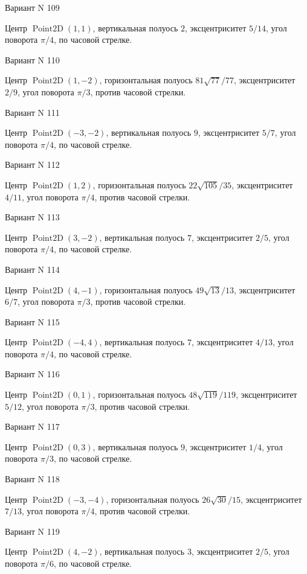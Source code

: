 \documentclass[11pt]{report}
\begin{document}
Вариант N 109

Центр $\operatorname{Point2D}\left(1, 1\right)$, вертикальная полуось $2$, эксцентриситет $5 / 14$, угол поворота $\pi / 4$, по часовой стрелке.

Вариант N 110

Центр $\operatorname{Point2D}\left(1, -2\right)$, горизонтальная полуось $81 \sqrt{77} / 77$, эксцентриситет $2 / 9$, угол поворота $\pi / 3$, против часовой стрелки.

Вариант N 111

Центр $\operatorname{Point2D}\left(-3, -2\right)$, вертикальная полуось $9$, эксцентриситет $5 / 7$, угол поворота $\pi / 4$, по часовой стрелке.

Вариант N 112

Центр $\operatorname{Point2D}\left(1, 2\right)$, горизонтальная полуось $22 \sqrt{105} / 35$, эксцентриситет $4 / 11$, угол поворота $\pi / 4$, против часовой стрелки.

Вариант N 113

Центр $\operatorname{Point2D}\left(3, -2\right)$, вертикальная полуось $7$, эксцентриситет $2 / 5$, угол поворота $\pi / 4$, по часовой стрелке.

Вариант N 114

Центр $\operatorname{Point2D}\left(4, -1\right)$, горизонтальная полуось $49 \sqrt{13} / 13$, эксцентриситет $6 / 7$, угол поворота $\pi / 3$, против часовой стрелки.

Вариант N 115

Центр $\operatorname{Point2D}\left(-4, 4\right)$, вертикальная полуось $7$, эксцентриситет $4 / 13$, угол поворота $\pi / 4$, по часовой стрелке.

Вариант N 116

Центр $\operatorname{Point2D}\left(0, 1\right)$, горизонтальная полуось $48 \sqrt{119} / 119$, эксцентриситет $5 / 12$, угол поворота $\pi / 3$, против часовой стрелки.

Вариант N 117

Центр $\operatorname{Point2D}\left(0, 3\right)$, вертикальная полуось $9$, эксцентриситет $1 / 4$, угол поворота $\pi / 3$, по часовой стрелке.

Вариант N 118

Центр $\operatorname{Point2D}\left(-3, -4\right)$, горизонтальная полуось $26 \sqrt{30} / 15$, эксцентриситет $7 / 13$, угол поворота $\pi / 4$, против часовой стрелки.

Вариант N 119

Центр $\operatorname{Point2D}\left(4, -2\right)$, вертикальная полуось $3$, эксцентриситет $2 / 5$, угол поворота $\pi / 6$, по часовой стрелке.
\end{document}
